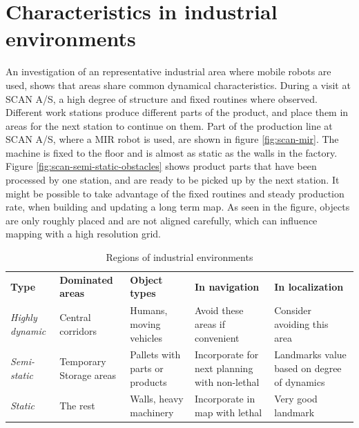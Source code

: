 \section{Characteristics in industrial environments}
\label{sec:characteristics_in_industrial_environments}
An investigation of an representative industrial area where mobile robots are used, shows that areas share common dynamical characteristics. 
During a visit at SCAN A/S, a high degree of structure and fixed routines where observed. 
Different work stations produce different parts of the product, and place them in areas for the next station to continue on them.
Part of the production line at SCAN A/S, where a MIR robot is used, are shown in figure \ref{fig:scan-mir}. 
The machine is fixed to the floor and is almost as static as the walls in the factory.
Figure \ref{fig:scan-semi-static-obstacles} shows product parts that have been processed by one station, and are ready to be picked up by the next station. 
It might be possible to take advantage of the fixed routines and steady production rate, when building and updating a long term map.
As seen in the figure, objects are only roughly placed and are not aligned carefully, which can influence mapping with a high resolution grid.

\begin{table}[htbp]
	\caption{Regions of industrial environments}
	\label{tab:regions_of_industrial_environments}
	\begin{center}
		\begin{tabular}{p{} | p{2.6cm} | p{2.6cm} | p{2.6cm} | p{2.6cm}}
			\toprule
			\textbf{Type} & \textbf{Dominated areas} & \textbf{Object types} & \textbf{In navigation} & \textbf{In localization} \\ 
			\rowcolor[gray]{0.925}
			\textit{Highly dynamic} & Central corridors & Humans, moving vehicles & Avoid these areas if convenient & Consider avoiding this area \\
			\textit{Semi-static} & Temporary Storage areas & Pallets with parts or products & Incorporate for next planning with non-lethal & Landmarks value based on degree of dynamics \\ 
			\rowcolor[gray]{0.925}
			\textit{Static} & The rest & Walls, heavy machinery & Incorporate in map with lethal & Very good landmark \\			
			\bottomrule
		\end{tabular} 
	\end{center}
\end{table}

